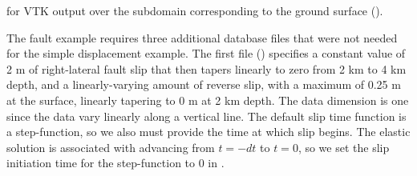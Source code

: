 \begin{inventory}
{    for VTK output over the subdomain corresponding to the ground surface
    ().}
\end{inventory}
The fault example requires three additional database files that were
not needed for the simple displacement example. The first file
() specifies a constant value of 2 m of
right-lateral fault slip that then tapers linearly to zero from 2 km
to 4 km depth, and a linearly-varying amount of reverse slip, with a
maximum of 0.25 m at the surface, linearly tapering to 0 m at 2 km
depth. The data dimension is one since the data vary linearly along a
vertical line. The default slip time function is a step-function, so
we also must provide the time at which slip begins. The elastic
solution is associated with advancing from $t=-dt$ to $t=0$, so we set
the slip initiation time for the step-function to 0 in
.

